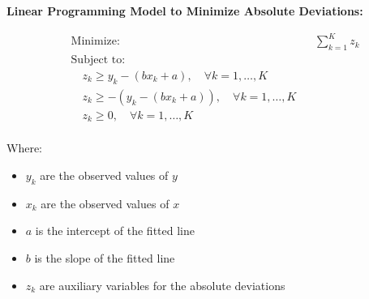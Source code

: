 \documentclass{article}
\begin{document}
\textbf{Linear Programming Model to Minimize Absolute Deviations:}

\[
\begin{aligned}
    & \text{Minimize:} && \sum_{k=1}^{K} z_k \\
    & \text{Subject to:} \\
    & \quad z_k \geq y_k - (bx_k + a), \quad \forall k = 1, \ldots, K \\
    & \quad z_k \geq -(y_k - (bx_k + a)), \quad \forall k = 1, \ldots, K \\
    & \quad z_k \geq 0, \quad \forall k = 1, \ldots, K \\
\end{aligned}
\]

Where:
\begin{itemize}
    \item \( y_k \) are the observed values of \( y \)
    \item \( x_k \) are the observed values of \( x \)
    \item \( a \) is the intercept of the fitted line
    \item \( b \) is the slope of the fitted line
    \item \( z_k \) are auxiliary variables for the absolute deviations
\end{itemize}
\end{document}
